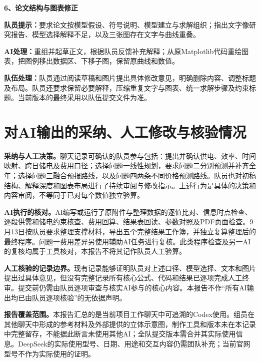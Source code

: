 \documentclass[UTF8,a4paper,12pt]{ctexart}
\newcommand{\field}[2]{\par\noindent\textbf{#1：}#2\par}
\newcommand{\example}[2]{\vspace{6pt}\noindent\textbf{#1、#2}\par}
\begin{document}
\example{6}{论文结构与图表修正}
\field{队员提示}{要求论文按模型假设、符号说明、模型建立与求解组织；指出文字像研究报告、模型选择解释不足，以及三张图存在文字与曲线重叠。}
\field{AI处理}{重组并起草正文，根据队员反馈补充解释；从原Matplotlib代码重绘图表，把图例移出数据区、下移子图，保留原曲线和数值。}
\field{队伍处理}{队员通过阅读草稿和图片提出具体修改意见，明确删除内容、调整标题及布局。队员还要求保留必要解释，压缩重复文字与图表、统一求解步骤及约束标题。当前版本的最终采用以队伍提交文件为准。}

\section{对AI输出的采纳、人工修改与核验情况}

\textbf{采纳与人工决策。}聊天记录可确认的队员参与包括：提出并确认供电、效率、时间映射、跨日储电及费用口径；选择问题一线性规划，要求问题二分别预测并补齐全年；选择问题三融合预报路线，以及问题四两条不同价格预测路线。队员也对初稿结构、解释深度和图表布局进行了持续审阅与修改指示。上述行为是具体的决策和内容审阅，不等同于已对每个数值独立验算。

\textbf{AI执行的核对。}AI编写或运行了原附件与整理数据的逐值比对、信息时点检查、逐段供需和储电约束核查、费用回算、结果表回读、参数对照及PDF页面检查。9月13日按队员要求整理支撑材料，导出五个完整结果工作簿，并独立复算整理后的最终程序。问题一费用差异另使用辅助AI任务进行复核。此类程序检查及另一AI的复核均属于工具核对，本报告不将其记作队员人工验算。

\textbf{人工核验的记录边界。}现有记录能够证明队员对上述口径、模型选择、文本和图片提出过具体意见，但没有完整记录所有核心公式、代码和结果已逐项完成人工终审。提交前仍需由队员逐项审查与核实AI参与的核心内容。本报告不作“所有AI输出均已由队员逐项核验”的无依据声明。

\textbf{报告覆盖范围。}本报告汇总的是当前项目工作聊天中可追溯的Codex使用。组员在其他聊天中形成的参考材料及外部提供的立体示意图，制作工具和版本未在本记录中完整留存，不能据此断言未使用其他AI；全队提交版本需合并其实际使用信息。DeepSeek的实际使用型号、日期、用途和交互内容仍需团队补充；当前官网型号不作为实际使用的证明。
\end{document}
